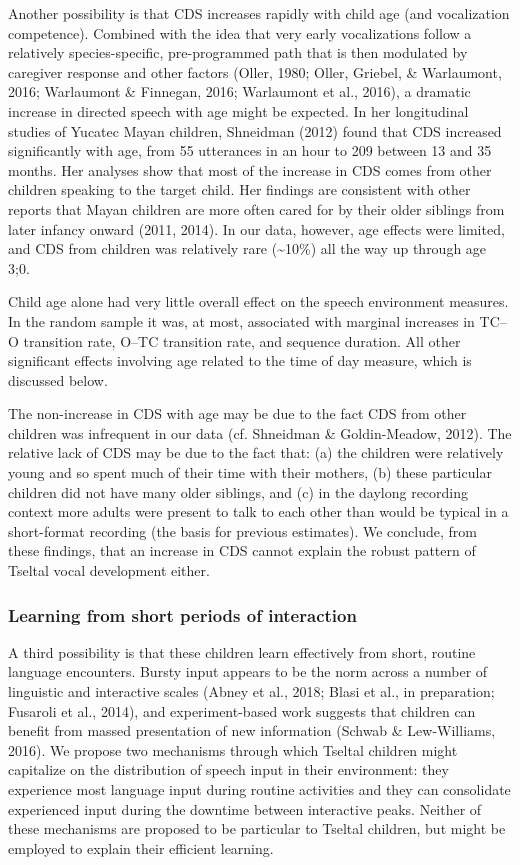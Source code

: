 \documentclass[floatsintext,man]{apa6}
\theoremstyle{definition}
\theoremstyle{definition}
\theoremstyle{definition}
\theoremstyle{remark}
\begin{document}
Another possibility is that CDS increases rapidly with child age (and
vocalization competence). Combined with the idea that very early
vocalizations follow a relatively species-specific, pre-programmed path
that is then modulated by caregiver response and other factors (Oller,
1980; Oller, Griebel, \& Warlaumont, 2016; Warlaumont \& Finnegan, 2016;
Warlaumont et al., 2016), a dramatic increase in directed speech with
age might be expected. In her longitudinal studies of Yucatec Mayan
children, Shneidman (2012) found that CDS increased significantly with
age, from 55 utterances in an hour to 209 between 13 and 35 months. Her
analyses show that most of the increase in CDS comes from other children
speaking to the target child. Her findings are consistent with other
reports that Mayan children are more often cared for by their older
siblings from later infancy onward (2011, 2014). In our data, however,
age effects were limited, and CDS from children was relatively rare
(\textasciitilde{}10\%) all the way up through age 3;0.

Child age alone had very little overall effect on the speech environment
measures. In the random sample it was, at most, associated with marginal
increases in TC--O transition rate, O--TC transition rate, and sequence
duration. All other significant effects involving age related to the
time of day measure, which is discussed below.

The non-increase in CDS with age may be due to the fact CDS from other
children was infrequent in our data (cf. Shneidman \& Goldin-Meadow,
2012). The relative lack of CDS may be due to the fact that: (a) the
children were relatively young and so spent much of their time with
their mothers, (b) these particular children did not have many older
siblings, and (c) in the daylong recording context more adults were
present to talk to each other than would be typical in a short-format
recording (the basis for previous estimates). We conclude, from these
findings, that an increase in CDS cannot explain the robust pattern of
Tseltal vocal development either.

\subsubsection{Learning from short periods of
interaction}\label{learning-from-short-periods-of-interaction}

A third possibility is that these children learn effectively from short,
routine language encounters. Bursty input appears to be the norm across
a number of linguistic and interactive scales (Abney et al., 2018; Blasi
et al., in preparation; Fusaroli et al., 2014), and experiment-based
work suggests that children can benefit from massed presentation of new
information (Schwab \& Lew-Williams, 2016). We propose two mechanisms
through which Tseltal children might capitalize on the distribution of
speech input in their environment: they experience most language input
during routine activities and they can consolidate experienced input
during the downtime between interactive peaks. Neither of these
mechanisms are proposed to be particular to Tseltal children, but might
be employed to explain their efficient learning.
\end{document}
